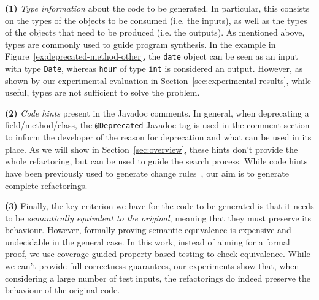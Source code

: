 \documentclass[sigconf,review,anonymous]{acmart}
\begin{document}
{\bf (1)} {\em Type information} about the code to be generated. In particular, this consists on the types of the objects to be consumed (i.e. the inputs), as well as the types of the objects that need to be produced (i.e. the outputs). As mentioned above, types are commonly used to guide  program synthesis. In the example in Figure~\ref{ex:deprecated-method-other}, the \texttt{date} object can be seen as an input with type \texttt{Date}, whereas \texttt{hour} of type \texttt{int} is considered an output.
However, as shown by our experimental evaluation in Section~\ref{sec:experimental-results}, while useful, types are not sufficient to solve the problem. %

{\bf (2)} {\em Code hints} present in the Javadoc comments. In general, when deprecating a field/method/class, the \texttt{@Deprecated} Javadoc tag is used in the
  comment section to inform the developer of the reason for deprecation and what can be used in its place. As we will show in Section~\ref{sec:overview}, these hints
  don't provide the whole refactoring, but can be used to guide the search process.
While code hints have been previously used to generate change rules~\cite{DBLP:conf/kbse/Huang0PW021}, our aim is to generate complete refactorings.
  
  {\bf (3)} Finally, the key criterion we have for the code to be generated is that it needs to be {\em semantically equivalent to the original}, meaning that they must preserve its behaviour. %
  However, formally proving semantic equivalence is expensive and undecidable in the general case. %
In this work, instead of aiming for a formal proof,  we use coverage-guided property-based testing to check equivalence. %
While we can't provide full correctness guarantees,
our experiments show that, when considering a large number of test inputs, the refactorings do indeed preserve the behaviour of the original code.
\end{document}
